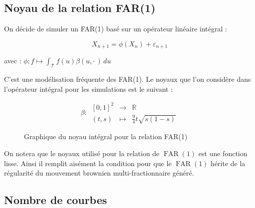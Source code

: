 \subsection{Noyau de la relation FAR(1)}
\begin{minipage}{0.48\linewidth}
	On décide de simuler un FAR(1) basé sur un opérateur linéaire intégral :

	$$
		X_{n+1} = \phi(X_n) + \varepsilon_{n+1}
	$$

	avec : $\phi : f \mapsto \displaystyle\int_{\mathcal T} f(u) \beta(u, \cdot \,) \, du$

	C'est une modélisation fréquente des FAR(1). Le noyaux que l'on considère dans l'opérateur intégral pour les simulations est le suivant :


	$$
		\beta : \, \begin{array}{ccc}
			[0,1]^2 & \longrightarrow & \mathbb R
			\\
			(t,s)   & \longmapsto     & \frac 9 4 t\sqrt{ s(1-s) }
		\end{array}
	$$

\end{minipage}
\hfill
\begin{minipage}{0.48\linewidth}
	\begin{figure}[H]
		\centering
		\caption{Graphique du noyau intégral pour la relation FAR(1)}
		\label{graph:far_kernel}
	\end{figure}
\end{minipage}

\bigskip

On notera que le noyaux utilisé pour la relation de $\operatorname{FAR}(1)$ est une fonction lisse. Ainsi il remplit aisément la condition pour que le $\operatorname{FAR}(1)$ hérite de la régularité du mouvement brownien multi-fractionnaire généré.

\subsection{Nombre de courbes}

